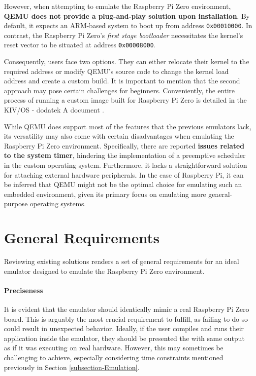 \documentclass[english, ing, kiv, he, iso690numb, pdf]{fasthesis}
\begin{document}
	However, when attempting to emulate the Raspberry Pi Zero environment, \textbf{QEMU does not provide a plug-and-play solution upon installation}. By default, it expects an ARM-based system to boot up from address \texttt{0x00010000}. In contrast, the Raspberry Pi Zero's \textit{first stage bootloader} necessitates the kernel's reset vector to be situated at address \texttt{0x00008000}.
	
	Consequently, users face two options. They can either relocate their kernel to the required address or modify QEMU's source code to change the kernel load address and create a custom build. It is important to mention that the second approach may pose certain challenges for beginners. Conveniently, the entire process of running a custom image built for Raspberry Pi Zero is detailed in the KIV/OS - dodatek A document \cite{KIV-OS-dotatek-A}.
	
	While QEMU does support most of the features that the previous emulators lack, its versatility may also come with certain disadvantages when emulating the Raspberry Pi Zero environment. Specifically, there are reported \textbf{issues related to the system timer}, hindering the implementation of a preemptive scheduler in the custom operating system. Furthermore, it lacks a straightforward solution for attaching external hardware peripherals. In the case of Raspberry Pi, it can be inferred that QEMU might not be the optimal choice for emulating such an embedded environment, given its primary focus on emulating more general-purpose operating systems.
	
	\section{General Requirements} \label{General Requirements}
	
	Reviewing existing solutions renders a set of general requirements for an ideal emulator designed to emulate the Raspberry Pi Zero environment.
	
	\paragraph{Preciseness}
	
	It is evident that the emulator should identically mimic a real Raspberry Pi Zero board. This is arguably the most crucial requirement to fulfill, as failing to do so could result in  unexpected behavior. Ideally, if the user compiles and runs their application inside the emulator, they should be presented the with same output as if it was executing on real hardware. However, this may sometimes be challenging to achieve, especially considering time constraints mentioned previously in \break Section \ref{subsection-Emulation}.
	
\end{document}
